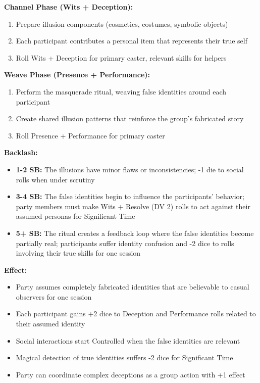 \documentclass[12pt,twoside]{book}
\begin{document}
\textbf{Channel Phase (Wits + Deception):}
\begin{enumerate}
\item Prepare illusion components (cosmetics, costumes, symbolic objects)
\item Each participant contributes a personal item that represents their true self
\item Roll Wits + Deception for primary caster, relevant skills for helpers
\end{enumerate}

\textbf{Weave Phase (Presence + Performance):}
\begin{enumerate}
\item Perform the masquerade ritual, weaving false identities around each participant
\item Create shared illusion patterns that reinforce the group's fabricated story
\item Roll Presence + Performance for primary caster
\end{enumerate}

\textbf{Backlash:}
\begin{itemize}
\item \textbf{1-2 SB:} The illusions have minor flaws or inconsistencies; -1 die to social rolls when under scrutiny
\item \textbf{3-4 SB:} The false identities begin to influence the participants' behavior; party members must make Wits + Resolve (DV 2) rolls to act against their assumed personas for Significant Time
\item \textbf{5+ SB:} The ritual creates a feedback loop where the false identities become partially real; participants suffer identity confusion and -2 dice to rolls involving their true skills for one session
\end{itemize}

\textbf{Effect:}
\begin{itemize}
\item Party assumes completely fabricated identities that are believable to casual observers for one session
\item Each participant gains +2 dice to Deception and Performance rolls related to their assumed identity
\item Social interactions start Controlled when the false identities are relevant
\item Magical detection of true identities suffers -2 dice for Significant Time
\item Party can coordinate complex deceptions as a group action with +1 effect
\end{itemize}
\end{document}
